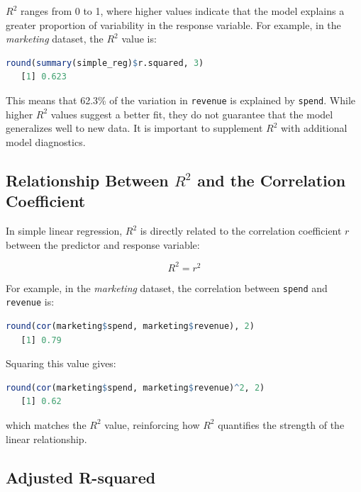 \documentclass[
]{book}
\newcommand{\passthrough}[1]{#1}
\theoremstyle{definition}
\theoremstyle{definition}
\theoremstyle{definition}
\theoremstyle{definition}
\theoremstyle{remark}
\begin{document}
\(R^2\) ranges from 0 to 1, where higher values indicate that the model explains a greater proportion of variability in the response variable. For example, in the \emph{marketing} dataset, the \(R^2\) value is:

\begin{lstlisting}[language=R]
round(summary(simple_reg)$r.squared, 3)
   [1] 0.623
\end{lstlisting}

This means that 62.3\% of the variation in \passthrough{\lstinline!revenue!} is explained by \passthrough{\lstinline!spend!}. While higher \(R^2\) values suggest a better fit, they do not guarantee that the model generalizes well to new data. It is important to supplement \(R^2\) with additional model diagnostics.

\subsection*{\texorpdfstring{Relationship Between \(R^2\) and the Correlation Coefficient}{Relationship Between R\^{}2 and the Correlation Coefficient}}\label{relationship-between-r2-and-the-correlation-coefficient}

In simple linear regression, \(R^2\) is directly related to the correlation coefficient \(r\) between the predictor and response variable:

\[
R^2 = r^2
\]

For example, in the \emph{marketing} dataset, the correlation between \passthrough{\lstinline!spend!} and \passthrough{\lstinline!revenue!} is:

\begin{lstlisting}[language=R]
round(cor(marketing$spend, marketing$revenue), 2)
   [1] 0.79
\end{lstlisting}

Squaring this value gives:

\begin{lstlisting}[language=R]
round(cor(marketing$spend, marketing$revenue)^2, 2)
   [1] 0.62
\end{lstlisting}

which matches the \(R^2\) value, reinforcing how \(R^2\) quantifies the strength of the linear relationship.

\subsection*{Adjusted R-squared}\label{adjusted-r-squared}
\end{document}
